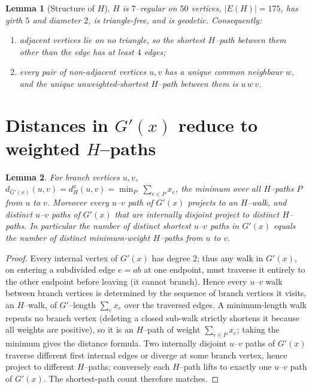 \documentclass{amsart}
\newtheorem{lemma}{Lemma}
\theoremstyle{definition}
\begin{document}
\begin{lemma}[Structure of $H$]\label{lem:struct}
$H$ is $7$--regular on $50$ vertices, $|E(H)|=175$, has girth $5$ and diameter
$2$, is triangle-free, and is geodetic. Consequently:
\begin{enumerate}
\item adjacent vertices lie on no triangle, so the shortest $H$--path between
them other than the edge has at least $4$ edges;
\item every pair of non-adjacent vertices $u,v$ has a unique common neighbour
$w$, and the unique \emph{unweighted}-shortest $H$--path between them is $u\,w\,v$.
\end{enumerate}
\end{lemma}

\section{Distances in $G'(x)$ reduce to weighted $H$--paths}

\begin{lemma}\label{lem:distbranch}
For branch vertices $u,v$,
$d_{G'(x)}(u,v)=d^x_H(u,v)=\min_{P}\ \sum_{e\in P}x_e$, the minimum over all
$H$--paths $P$ from $u$ to $v$. Moreover every $u$--$v$ path of $G'(x)$ projects
to an $H$--walk, and \emph{distinct} $u$--$v$ paths of $G'(x)$ that are internally
disjoint project to distinct $H$--paths. In particular the number of distinct
shortest $u$--$v$ paths in $G'(x)$ equals the number of distinct
minimum-weight $H$--paths from $u$ to $v$.
\end{lemma}

\begin{proof}
Every internal vertex of $G'(x)$ has degree $2$; thus any walk in $G'(x)$, on
entering a subdivided edge $e=ab$ at one endpoint, must traverse it entirely to
the other endpoint before leaving (it cannot branch). Hence every $u$--$v$ walk
between branch vertices is determined by the sequence of branch vertices it
visits, an $H$--walk, of $G'$--length $\sum_{e}x_e$ over the traversed edges. A
minimum-length walk repeats no branch vertex (deleting a closed sub-walk strictly
shortens it because all weights are positive), so it is an $H$--path of weight
$\sum_{e\in P}x_e$; taking the minimum gives the distance formula. Two internally
disjoint $u$--$v$ paths of $G'(x)$ traverse different first internal edges or
diverge at some branch vertex, hence project to different $H$--paths; conversely
each $H$--path lifts to exactly one $u$--$v$ path of $G'(x)$. The shortest-path
count therefore matches.
\end{proof}
\end{document}
